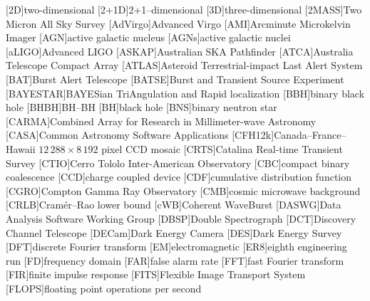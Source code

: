 \providecommand{\acrolowercase}[1]{\lowercase{#1}}

\begin{acronym}
[2D]{two\nobreakdashes-dimensional}
[2+1D]{2+1\nobreakdashes--dimensional}
[3D]{three\nobreakdashes-dimensional}
[2MASS]{Two Micron All Sky Survey}
[AdVirgo]{Advanced Virgo}
[AMI]{Arcminute Microkelvin Imager}
[AGN]{active galactic nucleus}
[AGN\acrolowercase{s}]{active galactic nuclei}
[aLIGO]{Advanced \acs{LIGO}}
[ASKAP]{Australian \acs{SKA} Pathfinder}
[ATCA]{Australia Telescope Compact Array}
[ATLAS]{Asteroid Terrestrial-impact Last Alert System}
[BAT]{Burst Alert Telescope}
[BATSE]{Burst and Transient Source Experiment}
[BAYESTAR]{BAYESian TriAngulation and Rapid localization}
[BBH]{binary black hole}
[BHBH]{\acl{BH}\nobreakdashes--\acl{BH}}
[BH]{black hole}
[BNS]{binary neutron star}
[CARMA]{Combined Array for Research in Millimeter\nobreakdashes-wave Astronomy}
[CASA]{Common Astronomy Software Applications}
[CFH12k]{Canada--France--Hawaii $12\,288 \times 8\,192$ pixel CCD mosaic}
[CRTS]{Catalina Real-time Transient Survey}
[CTIO]{Cerro Tololo Inter-American Observatory}
[CBC]{compact binary coalescence}
[CCD]{charge coupled device}
[CDF]{cumulative distribution function}
[CGRO]{Compton Gamma Ray Observatory}
[CMB]{cosmic microwave background}
[CRLB]{Cram\'{e}r\nobreakdashes--Rao lower bound}
[\acrolowercase{c}WB]{Coherent WaveBurst}
[DASWG]{Data Analysis Software Working Group}
[DBSP]{Double Spectrograph}
[DCT]{Discovery Channel Telescope}
[DECam]{Dark Energy Camera}
[DES]{Dark Energy Survey}
[DFT]{discrete Fourier transform}
[EM]{electromagnetic}
[ER8]{eighth engineering run}
[FD]{frequency domain}
[FAR]{false alarm rate}
[FFT]{fast Fourier transform}
[FIR]{finite impulse response}
[FITS]{Flexible Image Transport System}
[FLOPS]{floating point operations per second}

\end{acronym}

